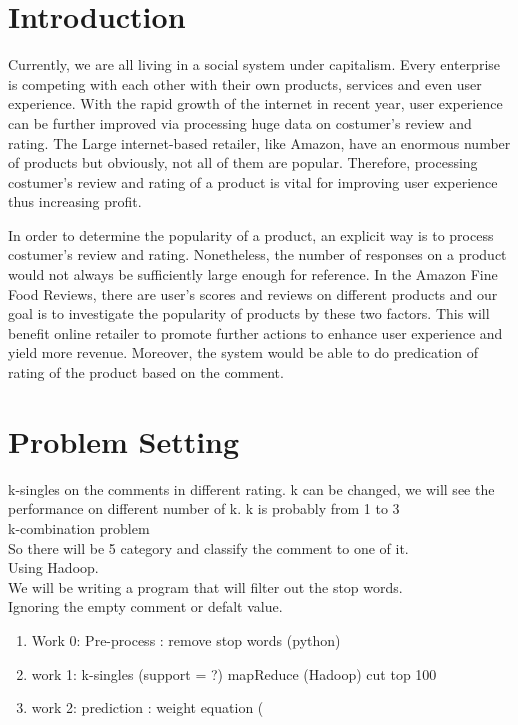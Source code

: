 \section{Introduction}
Currently, we are all living in a social system under capitalism. Every enterprise is competing with each other with their own products, services and even user experience. With the rapid growth of the internet in recent year, user experience can be further improved via processing huge data on costumer's review and rating. The Large internet-based retailer, like Amazon, have an enormous number of products but obviously, not all of them are popular. Therefore, processing costumer's review and rating of a product is vital for improving user experience thus increasing profit.

In order to determine the popularity of a product, an explicit way is to process costumer's review and rating. Nonetheless, the number of responses on a product would not always be sufficiently large enough for reference. In the Amazon Fine Food Reviews, there are user's scores and reviews on different products and our goal is to investigate the popularity of products by these two factors. This will benefit online retailer to promote further actions to enhance user experience and yield more revenue. Moreover, the system would be able to do predication of rating of the product based on the comment.


\section{Problem Setting}
k-singles on the comments in different rating. k can be changed, we will see the performance on different number of k. k is probably from 1 to 3\\
k-combination problem\\
So there will be 5 category and classify the comment to one of it.\\
Using Hadoop.\\
We will be writing a program that will filter out the stop words.\\
Ignoring the empty comment or defalt value.\\

\begin{enumerate}
\item Work 0: Pre-process : remove stop words (python)
\item work 1: k-singles (support = ?) mapReduce (Hadoop) cut top 100
\item work 2: prediction : weight equation (
\end{enumerate}

